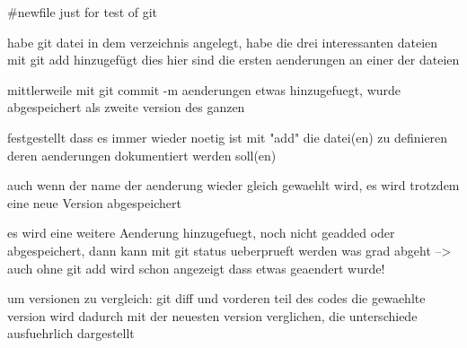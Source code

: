#newfile just for test of git

habe git datei in dem verzeichnis angelegt,
habe die drei interessanten dateien mit git add hinzugefügt
dies hier sind die ersten aenderungen an einer der dateien

mittlerweile mit git commit -m aenderungen etwas hinzugefuegt, 
wurde abgespeichert als zweite version des ganzen

festgestellt dass es immer wieder noetig ist mit "add"
die datei(en) zu definieren deren aenderungen dokumentiert werden soll(en)

auch wenn der name der aenderung wieder gleich gewaehlt wird,
es wird trotzdem eine neue Version abgespeichert

es wird eine weitere Aenderung hinzugefuegt,
noch nicht geadded oder abgespeichert,
dann kann mit git status ueberprueft werden was grad abgeht
--> auch ohne git add wird schon angezeigt dass etwas geaendert wurde!

um versionen zu vergleich: git diff und vorderen teil des codes
die gewaehlte version wird dadurch mit der neuesten version verglichen,
die unterschiede ausfuehrlich dargestellt